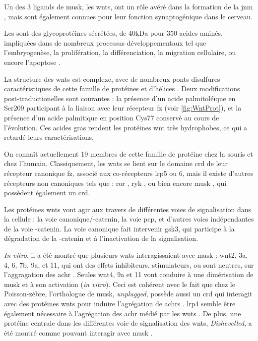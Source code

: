 	Un des 3 ligands de \gls{musk}, les \Glspl{wnt}, ont un rôle avéré dans la formation de la \gls{jnm} \cite{Hall2000}, mais sont également connues pour leur fonction synaptogénique dans le cerveau.
	
	Les  sont des glycoprotéines sécrétées, de 40kDa pour 350 acides aminés, impliquées dans de nombreux processus développementaux tel que l'embryogenèse, la prolifération, la différenciation, la migration cellulaire, ou encore l'apoptose \cite{Miller2002, Willert2012}. 
	
	La structure des \Glspl{wnt} est complexe, avec  de nombreux ponts disulfures caractéristiques de cette famille de protéines et d'hélices \textalpha{}. Deux modifications post-traductionelles sont courantes : la présence d'un acide palmitoléïque en Ser209 participant à la liaison avec leur récepteur \gls{fz} (voir \cref{fig:WntProt}), et la présence d'un acide palmitique en position Cys77 conservé au cours de l'évolution\cite{Takada2006}. Ces acides gras rendent les protéines \Gls{wnt} très hydrophobes, ce qui a retardé leurs caractérisations.
	
	On connaît actuellement 19 membres de cette famille de protéine chez la souris et chez l'humain. Classiquement, les \Glspl{wnt} se lient sur le domaine \gls{crd} de leur récepteur canonique \gls{fz}, associé aux co-récepteurs \gls{lrp}5 ou 6, mais il existe d'autres récepteurs non canoniques tels que : \gls{ror} \cite{Cadigan2006, Gordon2006, Green2008}, \gls{ryk} \cite{Bovolenta2006, Fradkin2010}, ou bien encore \gls{musk} \cite{Jing2009}, qui possèdent également un \gls{crd}.
	
	Les protéines \glspl{wnt} vont agir aux travers de différentes voies de signalisation dans la cellule : la voie canonique/\textbeta{}-catenin, la voie \gls{pcp}, et d'autres voies indépendantes de la voie \textbeta{}-catenin. La voie canonique fait intervenir \gls{gsk3}, qui participe à la dégradation de la \textBeta{}-catenin et à l'inactivation de la signalisation. 
	
	\emph{In vitro}, il a été montré que plusieurs \Glspl{wnt} interagissaient avec \gls{musk} : \Gls{wnt}2, 3a, 4, 6, 7b, 9a, et 11, qui ont des effets inhibiteurs, stimulateurs, ou sont neutres, sur l'aggragation des \gls{achr} \cite{Strochlic2012, Zhang2012, Barik2014}. Seules \gls{wnt}4, 9a et 11 vont conduire à une dimérisation de \gls{musk} et à son activation (\emph{in vitro}). Ceci est cohérent avec le fait que chez le Poisson-zèbre, l'orthologue de \gls{musk}, \emph{unplugged}, possède aussi un \gls{crd} qui interagit avec des protéines \Glspl{wnt} pour induire l'agrégation de \glspl{achr} \cite{Jing2009, Gordon2012}. \Gls{lrp}4 semble être également nécessaire à l'agrégation des \gls{achr} médié par les \gls{wnt}s \cite{Zhang2012}. De plus, une protéine centrale dans les différentes voie de signalisation des \Glspl{wnt}, \emph{Dishevelled}, a été montré comme pouvant interagir avec \gls{musk} \cite{Luo2002a}.

